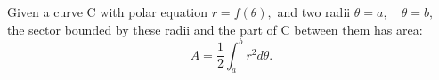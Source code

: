  Given a curve C with polar equation $ r = f( \theta ) , $ and two
radii $ \theta =a,  \quad \theta =b, $ the sector bounded by these radii and
the part of C between them has area:
\[ A = \frac{1}{2} \int _a ^b r^2 d \theta . \]
